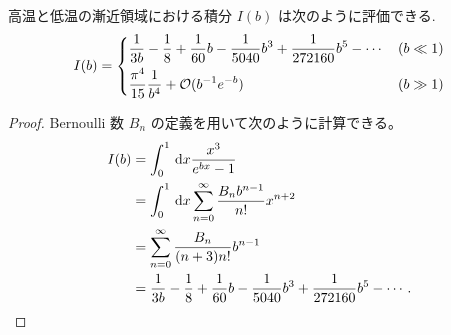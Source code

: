 \documentclass[a4paper,11pt]{jlreq}
\begin{document}
\begin{theorem}
  高温と低温の漸近領域における積分 $I(b)$ は次のように評価できる.
  \begin{align}
    I(b) =
    \begin{dcases}
      \frac{1}{3b} - \frac{1}{8} + \frac{1}{60}b - \frac{1}{5040}b^3 + \frac{1}{272160}b^5 - \cdots & (b\ll 1) \\
      \frac{\pi^4}{15}\frac{1}{b^4} + \mathcal{O}(b^{-1}e^{-b})                                     & (b\gg 1)
    \end{dcases}
  \end{align}
\end{theorem}
\begin{proof}
  Bernoulli 数 $B_n$ の定義を用いて次のように計算できる。
  \begin{align}
    I(b) & = \int_0^1\dl{x}\frac{x^3}{e^{bx} - 1}                                                           \\
         & = \int_0^1\dl{x}\sum_{n=0}^{\infty}\frac{B_n b^{n-1}}{n!}x^{n+2}                                 \\
         & = \sum_{n=0}^{\infty}\frac{B_n}{(n + 3)n!}b^{n-1}                                                \\
         & = \frac{1}{3b} - \frac{1}{8} + \frac{1}{60}b - \frac{1}{5040}b^3 + \frac{1}{272160}b^5 - \cdots.
  \end{align}


\end{proof}
\end{document}
